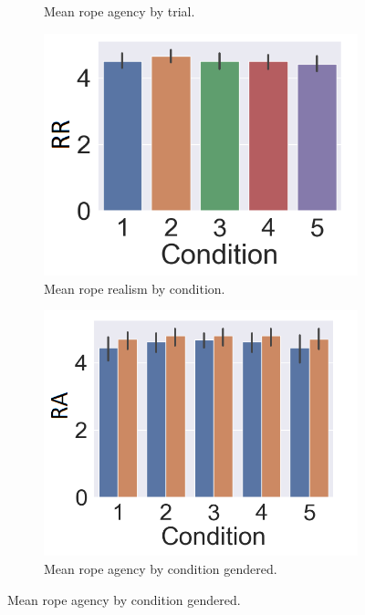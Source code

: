 \begin{figure}[H]
\begin{subfigure}[b]{0.3\textwidth}
     \caption{Mean rope agency by trial.}
     \label{fig:ropeOwnTrial}
 \end{subfigure}
 \begin{subfigure}[b]{0.3\textwidth}
     \centering
     \includegraphics[scale=0.35]{Files/Plots/rrcond.png}
     \caption{Mean rope realism by condition.}
     \label{fig:ropeRealCond}
 \end{subfigure}
 \hspace{-5mm}
  \begin{subfigure}[b]{0.3\textwidth}
     \centering
     \includegraphics[scale=0.3]{Files/Plots/rocond_gen.png}
     \caption{Mean rope agency by condition gendered.}

\end{subfigure}
\end{figure}

